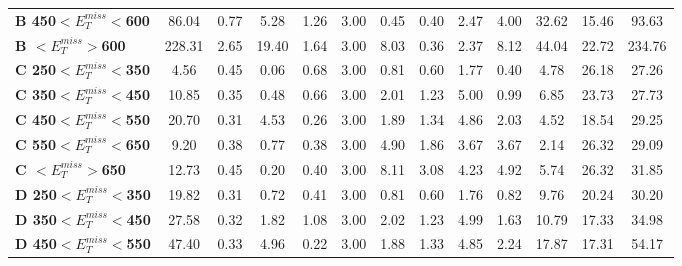 \begin{table}[h]
\begin{center}
{\begin{tabular}{|l|cccccccccccc|}
\textbf{ B 450$<E_T^{miss}<$600}         & 86.04         & 0.77          & 5.28          & 1.26          & 3.00          & 0.45          & 0.40          & 2.47          & 4.00          & 32.62         & 15.46         & 93.63         \\
\textbf{ B $<E_T^{miss}>$600}    & 228.31        & 2.65          & 19.40         & 1.64          & 3.00          & 8.03          & 0.36          & 2.37          & 8.12          & 44.04         & 22.72         & 234.76        \\
\textbf{ C 250$<E_T^{miss}<$350}         & 4.56          & 0.45          & 0.06          & 0.68          & 3.00          & 0.81          & 0.60          & 1.77          & 0.40          & 4.78          & 26.18         & 27.26         \\
\textbf{ C 350$<E_T^{miss}<$450}         & 10.85         & 0.35          & 0.48          & 0.66          & 3.00          & 2.01          & 1.23          & 5.00          & 0.99          & 6.85          & 23.73         & 27.73         \\
\textbf{ C 450$<E_T^{miss}<$550}         & 20.70         & 0.31          & 4.53          & 0.26          & 3.00          & 1.89          & 1.34          & 4.86          & 2.03          & 4.52          & 18.54         & 29.25         \\
\textbf{ C 550$<E_T^{miss}<$650}         & 9.20          & 0.38          & 0.77          & 0.38          & 3.00          & 4.90          & 1.86          & 3.67          & 3.67          & 2.14          & 26.32         & 29.09         \\
\textbf{ C $<E_T^{miss}>$650}    & 12.73         & 0.45          & 0.20          & 0.40          & 3.00          & 8.11          & 3.08          & 4.23          & 4.92          & 5.74          & 26.32         & 31.85         \\
\textbf{ D 250$<E_T^{miss}<$350}         & 19.82         & 0.31          & 0.72          & 0.41          & 3.00          & 0.81          & 0.60          & 1.76          & 0.82          & 9.76          & 20.24         & 30.20         \\
\textbf{ D 350$<E_T^{miss}<$450}         & 27.58         & 0.32          & 1.82          & 1.08          & 3.00          & 2.02          & 1.23          & 4.99          & 1.63          & 10.79         & 17.33         & 34.98         \\
\textbf{ D 450$<E_T^{miss}<$550}         & 47.40         & 0.33          & 4.96          & 0.22          & 3.00          & 1.88          & 1.33          & 4.85          & 2.24          & 17.87         & 17.31         & 54.17         \\

\end{tabular}}
\end{center}
\end{table}
